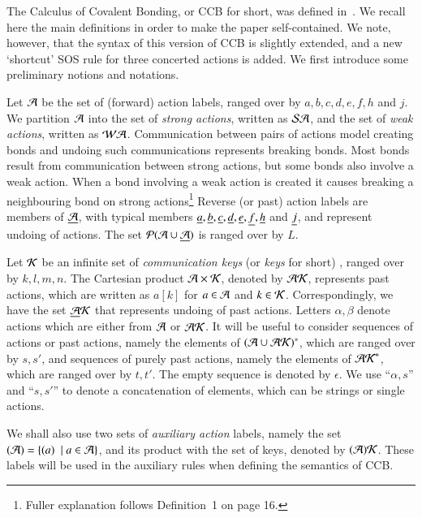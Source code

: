 %
The Calculus of Covalent Bonding, or CCB for short, was defined in~\cite{KU2017}. 
We recall here the main definitions in order to make the paper self-contained. 
We note, however, that the syntax of this version of CCB is slightly extended, and a new `shortcut'  
SOS rule for three concerted actions is added. 
We first introduce some preliminary notions and notations.

Let $\mathcal{A}$ be the set of (forward) action labels, 
ranged over by $a,b,c,d,e,f,h$ and $j$. We partition $\mathcal{A}$ into the set of \emph{strong actions}, written as
$\mathcal{SA}$, and the set of \emph{weak actions}, written as $\mathcal{WA}$. 
Communication between pairs of actions model creating bonds and undoing such communications represents breaking bonds. Most bonds result from communication between strong actions, but some bonds also involve a weak action. When a bond involving a weak action is created it causes breaking a neighbouring bond on strong actions\footnote{Fuller explanation follows Definition~1 on page 16.
}
Reverse (or past) action labels are members of
$\underline{\mathcal{A}}$, with typical members $\underline {a},\underline {b}, \underline {c},\underline {d}, \underline {e} ,\underline {f}, \underline {h}$ and $\underline {j}$, and represent 
undoing of actions. The set $\mathcal{P}(\mathcal{A} \cup \underline{\mathcal{A}})$ is ranged over by $L$.

Let $\mathcal{K}$ be an infinite set of {\em communication keys} (or {\em keys} for short)
\cite{PhillipsUlidowski06,PHILLIPS200770}, ranged over by $k,l, m,n$. The Cartesian product $\mathcal A \times \mathcal{K}$, denoted by $\mathcal{AK}$,
 represents past actions, which are written as $a[k]$ for $a\in \mathcal{A}$ and $k\in\mathcal{K}$. 
Correspondingly, we have the set $\underline{\mathcal{A}}\mathcal{K}$ that represents undoing of past actions. Letters $\alpha, \beta$ denote actions which are either from $\mathcal{A}$ or $\mathcal{AK}$. It will be 
useful to consider sequences of actions or past actions, namely the elements of $(\mathcal{A} \cup \mathcal{AK})^*$, 
which are ranged over by $s,s'$, and sequences of purely past actions, namely the elements of $\mathcal{AK}^*$, 
which are ranged over by $t,t'$. The empty sequence is denoted by $\epsilon$. We use ``$\alpha, s$'' and
``$s,s'$'' to denote a concatenation of elements, which can be strings or single actions.

We shall also use two sets of \emph{auxiliary action} labels, namely the set $(\mathcal{A}) =\{ (a)\ \mid a\in\mathcal{A}\}$, and its product with the set of keys, denoted by $(\mathcal{A})\mathcal{K}$. These labels will be used in the auxiliary rules when defining
the semantics of CCB.

